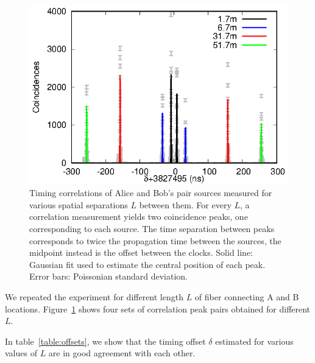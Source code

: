 \documentclass[aps,pra,onecolumn, superscriptaddress]{revtex4}
\begin{document}
\begin{figure}[htbp]
  \centering
  \includegraphics[width=16cm]{figures/g2/g2.eps}
  \caption{\label{fig:g2}
  Timing correlations of Alice and Bob's pair sources measured for various spatial separations $L$ between them.  
  For every $L$, a correlation measurement yields two coincidence peaks, 
  one corresponding to each source.
  The time separation between peaks corresponds to twice the propagation time between the sources, the midpoint instead is the offset between the clocks.
  Solid line: Gaussian fit used to estimate the central position of each peak.
  Error bars: Poissonian standard deviation.
  }
\end{figure}

We repeated the experiment for different length $L$ of fiber connecting A and B locations.
Figure~\ref{fig:g2} shows four sets of correlation peak pairs obtained for different $L$.


In table~\ref{table:offsets}, we show that the timing offset $\delta$ estimated for various values of $L$ are in good agreement with each other.
\end{document}
